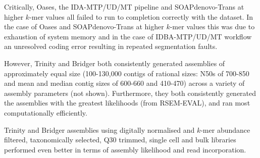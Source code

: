 Critically, Oases, the IDA-MTP/UD/MT pipeline and SOAPdenovo-Trans at higher \(k\)-mer values
all failed to run to completion correctly with the dataset.  In the case of Oases
and SOAPdenovo-Trans at higher \(k\)-mer values this was due to exhaustion
of system memory and in the case of IDBA-MTP/UD/MT workflow an unresolved coding error 
resulting in repeated segmentation faults.

However, Trinity and Bridger both consistently generated assemblies of approximately
equal size (100-130,000 contigs of rational sizes: N50s of 700-850
    and mean and median contig sizes of 600-660 and 410-470) across a variety 
    of assembly parameters (not shown).  Furthermore, they both consistently
    generated the assemblies with the greatest likelihoods (from RSEM-EVAL), 
    and ran most computationally efficiently. 


Trinity and Bridger assemblies using digitally normalised and \(k\)-mer abundance 
filtered, taxonomically selected, Q30 trimmed, single cell and bulk libraries performed 
even better in terms of assembly likelihood and read incorporation.

\begin{table}[h!]

    \caption[Trinity vs. Bridger Assemblies]{Assembly summaries of Q30 trimmed taxonomically selected SCT and bulk reads 
    after digital normalisation and \(k\)-mer abundance filtering. Parameters used in the assembly
indicates any special parameter settings used in the assembly i.e. K19 indicates a \(k\)-mer size of 19 was used.
}
    \label{tab:digassemby}
\end{table}

